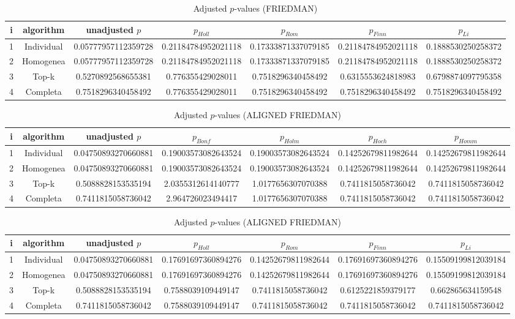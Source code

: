 \documentclass[a4paper,10pt]{article}
\begin{document}
\begin{landscape}
\begin{table}[!htp]
\centering\scriptsize
\caption{Adjusted $p$-values (FRIEDMAN)}
\begin{tabular}{ccccccc}
i&algorithm&unadjusted $p$&$p_{Holl}$&$p_{Rom}$&$p_{Finn}$&$p_{Li}$\\
\hline
1&Individual&0.05777957112359728&0.21184784952021118&0.17333871337079185&0.21184784952021118&0.1888530250258372\\
2&Homogenea&0.05777957112359728&0.21184784952021118&0.17333871337079185&0.21184784952021118&0.1888530250258372\\
3&Top-k&0.5270892568655381&0.776355429028011&0.7518296340458492&0.6315553624818983&0.6798874097795358\\
4&Completa&0.7518296340458492&0.776355429028011&0.7518296340458492&0.7518296340458492&0.7518296340458492\\
\hline
\end{tabular}
\end{table}


\newpage

\begin{table}[!htp]
\centering\scriptsize
\caption{Adjusted $p$-values (ALIGNED FRIEDMAN)}
\begin{tabular}{ccccccc}
i&algorithm&unadjusted $p$&$p_{Bonf}$&$p_{Holm}$&$p_{Hoch}$&$p_{Homm}$\\
\hline
1&Individual&0.04750893270660881&0.19003573082643524&0.19003573082643524&0.14252679811982644&0.14252679811982644\\
2&Homogenea&0.04750893270660881&0.19003573082643524&0.19003573082643524&0.14252679811982644&0.14252679811982644\\
3&Top-k&0.5088828153535194&2.0355312614140777&1.0177656307070388&0.7411815058736042&0.7411815058736042\\
4&Completa&0.7411815058736042&2.964726023494417&1.0177656307070388&0.7411815058736042&0.7411815058736042\\
\hline
\end{tabular}
\end{table}

\begin{table}[!htp]
\centering\scriptsize
\caption{Adjusted $p$-values (ALIGNED FRIEDMAN)}
\begin{tabular}{ccccccc}
i&algorithm&unadjusted $p$&$p_{Holl}$&$p_{Rom}$&$p_{Finn}$&$p_{Li}$\\
\hline
1&Individual&0.04750893270660881&0.17691697360894276&0.14252679811982644&0.17691697360894276&0.15509199812039184\\
2&Homogenea&0.04750893270660881&0.17691697360894276&0.14252679811982644&0.17691697360894276&0.15509199812039184\\
3&Top-k&0.5088828153535194&0.7588039109449147&0.7411815058736042&0.6125221859379177&0.662865634159548\\
4&Completa&0.7411815058736042&0.7588039109449147&0.7411815058736042&0.7411815058736042&0.7411815058736042\\
\hline
\end{tabular}
\end{table}



\end{landscape}
\end{document}
